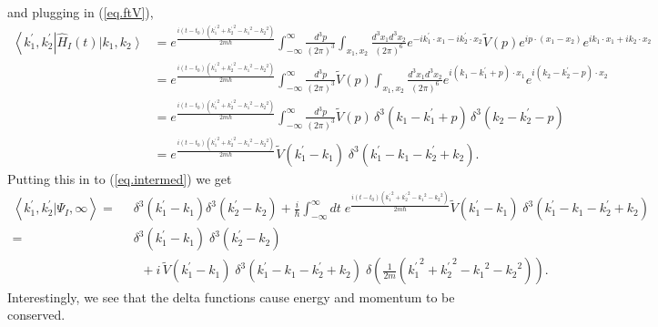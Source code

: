 \documentclass[11pt]{article}
\newcommand{\bra}[1]{\left\langle#1\right|}
\newcommand{\ket}[1]{\left|#1\right\rangle}
\newcommand{\braket}[2]{\left\langle#1|#2\right\rangle}
\newcommand{\op}[1]{\hat{#1}}
\theoremstyle{theorem}
\theoremstyle{remark}
\theoremstyle{step}
\theoremstyle{gap}
\begin{document}
and plugging in (\ref{eq.ftV}),
\begin{align*}
\bra{k_1^\prime, k_2^\prime} \op{H}_I(t)\ket{k_1, k_2} 
&= e^{\frac{i\left(t-t_0\right)\left({k_1^\prime}^2 + {k_2^\prime}^2 - {k_1}^2 - {k_2}^2\right)}{2m\hbar}} \int_{-\infty}^{\infty} \frac{d^3p}{(2\pi)^3}\int_{x_1, x_2} \frac{d^3 x_1 d^3 x_2}{(2\pi)^6}e^{-ik_1^\prime\cdot x_1 - ik_2^\prime\cdot x_2}\widetilde{V}(p)e^{ip\cdot(x_1-x_2)} e^{ik_1\cdot x_1 + ik_2\cdot x_2} \\
&= e^{\frac{i\left(t-t_0\right)\left({k_1^\prime}^2 + {k_2^\prime}^2 - {k_1}^2 - {k_2}^2\right)}{2m\hbar}} \int_{-\infty}^{\infty} \frac{d^3p}{(2\pi)^3}\widetilde{V}(p) \int_{x_1, x_2} \frac{d^3 x_1 d^3 x_2}{(2\pi)^6}e^{i(k_1-k_1^\prime+p)\cdot x_1}e^{i(k_2-k_2^\prime-p)\cdot x_2}\\
&= e^{\frac{i\left(t-t_0\right)\left({k_1^\prime}^2 + {k_2^\prime}^2 - {k_1}^2 - {k_2}^2\right)}{2m\hbar}} \int_{-\infty}^{\infty} \frac{d^3p}{(2\pi)^3}\widetilde{V}(p) \,\delta^3(k_1-k_1^\prime+p)\,\delta^3(k_2-k_2^\prime-p)\\
&= e^{\frac{i\left(t-t_0\right)\left({k_1^\prime}^2 + {k_2^\prime}^2 - {k_1}^2 - {k_2}^2\right)}{2m\hbar}} \widetilde{V}(k_1^\prime-k_1) \;\delta^3(k_1^\prime-k_1-k_2^\prime+k_2).
\end{align*}
Putting this in to (\ref{eq.intermed}) we get
\begin{align}
\braket{k_1^\prime, k_2^\prime}{\Psi_I, \infty} =&\;\; \delta^3(k_1^\prime - k_1)\delta^3(k_2^\prime - k_2) + \frac{i}{\hbar} \int_{-\infty}^\infty dt\;e^{\frac{i\left(t-t_0\right)\left({k_1^\prime}^2 + {k_2^\prime}^2 - {k_1}^2 - {k_2}^2\right)}{2m\hbar}} \widetilde{V}(k_1^\prime-k_1) \;\delta^3(k_1^\prime-k_1-k_2^\prime+k_2) \nonumber\\
=& \;\;\delta^3(k_1^\prime - k_1)\;\delta^3(k_2^\prime - k_2) \nonumber\\&\;\;\;\;+ {i}\, \widetilde{V}(k_1^\prime-k_1) \;\delta^3(k_1^\prime-k_1-k_2^\prime+k_2) \;\delta\left(\frac{1}{{2m}}\left({k_1^\prime}^2 + {k_2^\prime}^2 - {k_1}^2 - {k_2}^2\right)\right).
\end{align}
Interestingly, we see that the delta functions cause energy and momentum to be conserved.
\end{document}
